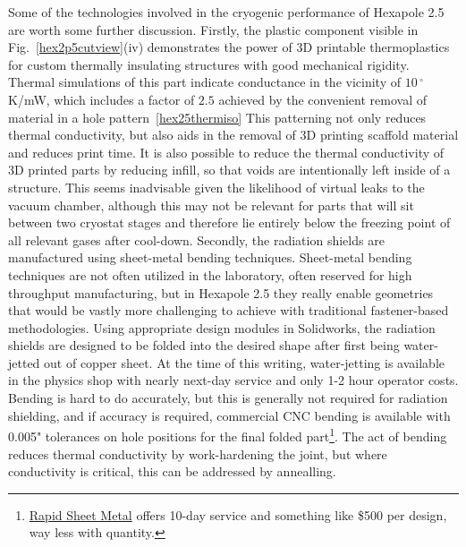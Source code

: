 Some of the technologies involved in the cryogenic performance of Hexapole 2.5 are worth some further discussion.
Firstly, the plastic component visible in Fig.~\ref{hex2p5cutview}(iv) demonstrates the power of 3D printable thermoplastics for custom thermally insulating structures with good mechanical rigidity.
Thermal simulations of this part indicate conductance in the vicinity of $10\,^\circ$K/mW, which includes a factor of $2.5$ achieved by the convenient removal of material in a hole pattern~\ref{hex25thermiso}
This patterning not only reduces thermal conductivity, but also aids in the removal of 3D printing scaffold material and reduces print time.
It is also possible to reduce the thermal conductivity of 3D printed parts by reducing infill, so that voids are intentionally left inside of a structure.
This seems inadvisable given the likelihood of virtual leaks to the vacuum chamber, although this may not be relevant for parts that will sit between two cryostat stages and therefore lie entirely below the freezing point of all relevant gases after cool-down.
Secondly, the radiation shields are manufactured using sheet-metal bending techniques.
Sheet-metal bending techniques are not often utilized in the laboratory, often reserved for high throughput manufacturing, but in Hexapole 2.5 they really enable geometries that would be vastly more challenging to achieve with traditional fastener-based methodologies.
Using appropriate design modules in Solidworks, the radiation shields are designed to be folded into the desired shape after first being water-jetted out of copper sheet.
At the time of this writing, water-jetting is available in the physics shop with nearly next-day service and only 1-2 hour operator costs.
Bending is hard to do accurately, but this is generally not required for radiation shielding, and if accuracy is required, commercial CNC bending is available with 0.005" tolerances on hole positions for the final folded part\footnote{\href{https://rapidmanufacturing.com/rapid-sheet-metal/}{Rapid Sheet Metal} offers 10-day service and something like \$500 per design, way less with quantity.}.
The act of bending reduces thermal conductivity by work-hardening the joint, but where conductivity is critical, this can be addressed by annealling.


